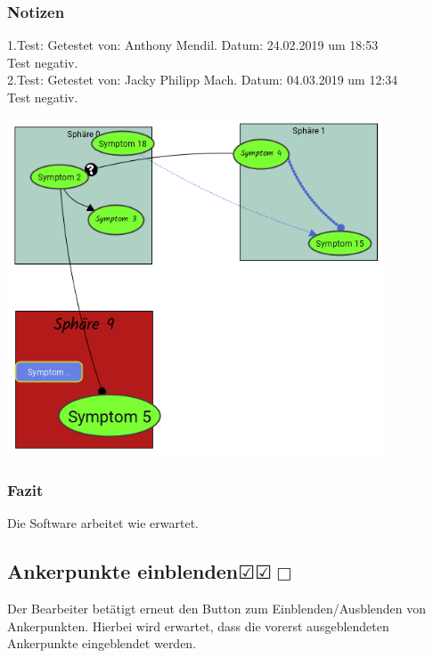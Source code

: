 \documentclass[enabledeprecatedfontcommands]{scrartcl}
\newcommand{\subsectiont}[2]{\subsection[#1]{#1{\normalsize\normalfont #2}}}
\newcommand{\leer}{$\Box$}
\newcommand{\ok}{$\CheckedBox$}
\begin{document}
\subsubsection{Notizen}
1.Test: Getestet von: Anthony Mendil. Datum: 24.02.2019 um 18:53 \\
Test negativ.\\
2.Test: Getestet von: Jacky Philipp Mach. Datum: 04.03.2019 um 12:34 \\
Test negativ.
\begin{center}
\includegraphics[height=10cm]{3_38.PNG}
\end{center}
\subsubsection{Fazit}
Die Software arbeitet wie erwartet.

\subsectiont{Ankerpunkte einblenden}{\dotfill\ok\ok\leer}
Der Bearbeiter betätigt erneut den Button zum Einblenden/Ausblenden von Ankerpunkten. Hierbei wird erwartet, dass die vorerst ausgeblendeten Ankerpunkte eingeblendet werden. 
\end{document}
